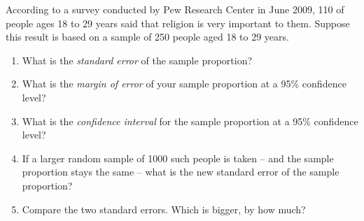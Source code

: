 \documentclass[11pt]{book}\usepackage[]{graphicx}\usepackage[]{color}
\begin{document}
\begin{exercises}
\begin{exercise}
\begin{center}
\end{center}

According to a survey conducted by Pew Research Center in June 2009, 110 of people ages 18 to 29 years said that religion is very important to them. Suppose this result is based on a sample of 250 people aged 18 to 29 years.

\begin{enumerate}
\item What is the \textit{standard error} of the sample proportion?
\item What is the \textit{margin of error} of your sample proportion at a 95\% confidence level?
\item What is the \textit{confidence interval} for the sample proportion at a 95\% confidence level?
\item If a larger random sample of 1000 such people is taken -- and the sample proportion stays the same -- what is the new standard error of the sample proportion?
\item Compare the two standard errors. Which is bigger, by how much?
\end{enumerate}

\end{exercise}
\begin{solution}  %



\end{solution}
\end{exercises}
\end{document}
